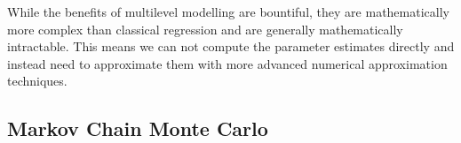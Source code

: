 While the benefits of multilevel modelling are bountiful, they are mathematically more complex than classical regression and are generally mathematically intractable. This means we can not compute the parameter estimates directly and instead need to approximate them with more advanced numerical approximation techniques.

\subsection{Markov Chain Monte Carlo}

\begin{figure}
	 \\

\end{figure}
